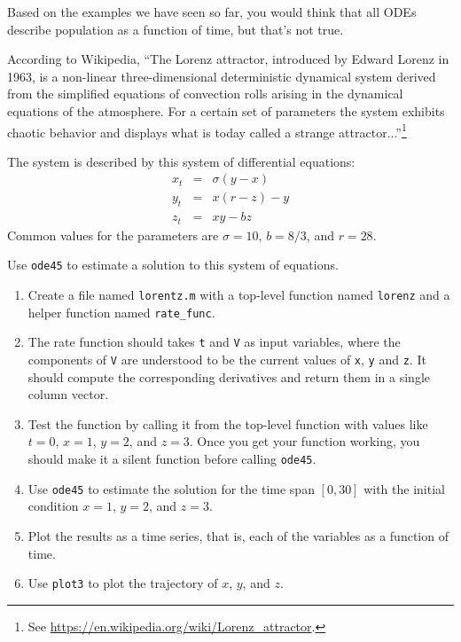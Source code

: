 \begin{ex}


Based on the examples we have seen so far, you would think that
all ODEs describe population as
a function of time, but that's not true.

According to Wikipedia,
``The Lorenz attractor, introduced by Edward Lorenz in 1963, is a
non-linear three-dimensional deterministic dynamical system derived
from the simplified equations of convection rolls arising in the
dynamical equations of the atmosphere. For a certain set of parameters
the system exhibits chaotic behavior and displays what is today called
a strange attractor...''\footnote{See \url{https://en.wikipedia.org/wiki/Lorenz_attractor}.}

The system is described by this system of differential equations:
%
\begin{eqnarray}
x_t &=& \sigma (y - x)  \\
y_t &=& x (r - z) - y   \\
z_t &=& xy - b z
\end{eqnarray}
%
Common values for the parameters are $\sigma = 10$, $b = 8/3$, and $r=28$.

Use {\tt ode45} to estimate a solution to this
system of equations.


\begin{enumerate}

\item Create a file named {\tt lorentz.m} with a top-level function named {\tt lorenz} and a helper function named \verb"rate_func".

\item  The rate function should
takes {\tt t} and {\tt V} as input variables, where the components
of {\tt V} are understood to be the current values of {\tt x},
{\tt y} and {\tt z}.  It should compute the corresponding derivatives
and return them in a single column vector.

\item Test the function by calling it from the top-level function with values like $t=0$, $x=1$, $y=2$, and $z=3$.  Once you get your function working, you should make it a silent function before calling {\tt ode45}.

\item Use {\tt ode45}
to estimate the solution for the time span $[0, 30]$
with the initial condition $x=1$, $y=2$, and $z=3$.

\item Plot the results as a time series, that is, each of the variables as a function of time.

\item Use {\tt plot3} to plot the trajectory of
$x$, $y$, and $z$.

\end{enumerate}

\end{ex}

